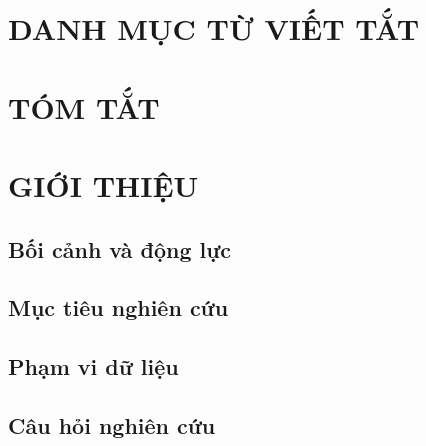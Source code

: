 \documentclass[a4paper,12pt]{report}
\begin{document}
\listoffigures
{}

\chapter*{DANH MỤC TỪ VIẾT TẮT}
%

\chapter*{TÓM TẮT}
%


\chapter{GIỚI THIỆU}

\section{Bối cảnh và động lực}

\section{Mục tiêu nghiên cứu}

\section{Phạm vi dữ liệu}

\section{Câu hỏi nghiên cứu}
\end{document}
